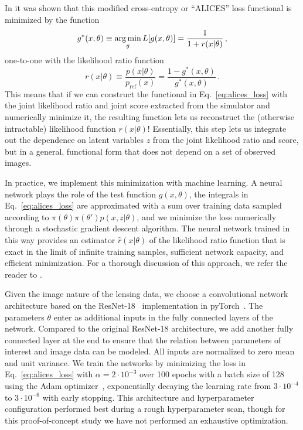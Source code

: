 \documentclass[twocolumn]{aastex62}
\begin{document}
In \citep{Stoye:2018ovl} it was shown that this modified cross-entropy or ``ALICES'' loss functional is minimized by the function
%
\begin{equation}
  g^*(x, \theta) \equiv \argmin_g L[g(x, \theta)] = \frac 1 {1 + r(x|\theta)} \,,
\end{equation}
%
one-to-one with the likelihood ratio function
%
\begin{equation}
  r(x|\theta)
  \equiv \frac {p(x|\theta)} {p_\mathrm{ref}(x)}
  = \frac {1 - g^*(x, \theta)}{g^*(x, \theta)} \,.
\end{equation}
%
This means that if we can construct the functional in Eq.~\eqref{eq:alices_loss} with the joint likelihood ratio and joint score extracted from the simulator and numerically minimize it, the resulting function lets us reconstruct the (otherwise intractable) likelihood function $r(x|\theta)$! Essentially, this step lets us integrate out the dependence on latent variables $z$ from the joint likelihood ratio and score, but in a general, functional form that does not depend on a set of observed images.

In practice, we implement this minimization with machine learning. A neural network plays the role of the test function $g(x, \theta)$, the integrals in Eq.~\eqref{eq:alices_loss} are approximated with a sum over training data sampled according to $\pi(\theta) \pi(\theta') p(x,z|\theta)$, and we minimize the loss numerically through a stochastic gradient descent algorithm. The neural network trained in this way provides an estimator $\hat{r}(x|\theta)$ of the likelihood ratio function that is exact in the limit of infinite training samples, sufficient network capacity, and efficient minimization. For a thorough discussion of this approach, we refer the reader to \cite{1805.00013,1805.00020,1805.12244,Stoye:2018ovl}.

Given the image nature of the lensing data, we choose a convolutional network architecture based on the ResNet-18~\citep{he2016deep} implementation in pyTorch~\citep{paszke2017automatic}. The parameters $\theta$ enter as additional inputs in the fully connected layers of the network. Compared to the original ResNet-18 architecture, we add another fully connected layer at the end to ensure that the relation between parameters of interest and image data can be modeled. All inputs are normalized to zero mean and unit variance. We train the networks by minimizing the loss in Eq.~\eqref{eq:alices_loss} with $\alpha = 2 \cdot 10^{-3}$ over 100 epochs with a batch size of 128 using the Adam optimizer~\citep{2014arXiv1412.6980K}, exponentially decaying the learning rate from $3\cdot 10^{-4}$ to $3 \cdot 10^{-6}$ with early stopping. This architecture and hyperparameter configuration performed best during a rough hyperparameter scan, though for this proof-of-concept study we have not performed an exhaustive optimization.
\end{document}
